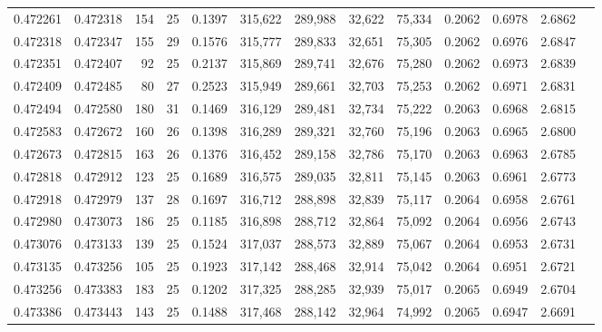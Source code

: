 \begin{tabular}{rrrrrrrrrrrrr}
0.472261 & 0.472318 & 154 &  25 &                                     0.1397 & 315,622 & 289,988 &  32,622 &  75,334 & 0.2062 & 0.6978 & 2.6862 \\
0.472318 & 0.472347 & 155 &  29 &                                     0.1576 & 315,777 & 289,833 &  32,651 &  75,305 & 0.2062 & 0.6976 & 2.6847 \\
0.472351 & 0.472407 &  92 &  25 &                                     0.2137 & 315,869 & 289,741 &  32,676 &  75,280 & 0.2062 & 0.6973 & 2.6839 \\
0.472409 & 0.472485 &  80 &  27 &                                     0.2523 & 315,949 & 289,661 &  32,703 &  75,253 & 0.2062 & 0.6971 & 2.6831 \\
0.472494 & 0.472580 & 180 &  31 &                                     0.1469 & 316,129 & 289,481 &  32,734 &  75,222 & 0.2063 & 0.6968 & 2.6815 \\
0.472583 & 0.472672 & 160 &  26 &                                     0.1398 & 316,289 & 289,321 &  32,760 &  75,196 & 0.2063 & 0.6965 & 2.6800 \\
0.472673 & 0.472815 & 163 &  26 &                                     0.1376 & 316,452 & 289,158 &  32,786 &  75,170 & 0.2063 & 0.6963 & 2.6785 \\
0.472818 & 0.472912 & 123 &  25 &                                     0.1689 & 316,575 & 289,035 &  32,811 &  75,145 & 0.2063 & 0.6961 & 2.6773 \\
0.472918 & 0.472979 & 137 &  28 &                                     0.1697 & 316,712 & 288,898 &  32,839 &  75,117 & 0.2064 & 0.6958 & 2.6761 \\
0.472980 & 0.473073 & 186 &  25 &                                     0.1185 & 316,898 & 288,712 &  32,864 &  75,092 & 0.2064 & 0.6956 & 2.6743 \\
0.473076 & 0.473133 & 139 &  25 &                                     0.1524 & 317,037 & 288,573 &  32,889 &  75,067 & 0.2064 & 0.6953 & 2.6731 \\
0.473135 & 0.473256 & 105 &  25 &                                     0.1923 & 317,142 & 288,468 &  32,914 &  75,042 & 0.2064 & 0.6951 & 2.6721 \\
0.473256 & 0.473383 & 183 &  25 &                                     0.1202 & 317,325 & 288,285 &  32,939 &  75,017 & 0.2065 & 0.6949 & 2.6704 \\
0.473386 & 0.473443 & 143 &  25 &                                     0.1488 & 317,468 & 288,142 &  32,964 &  74,992 & 0.2065 & 0.6947 & 2.6691 \\

\end{tabular}
